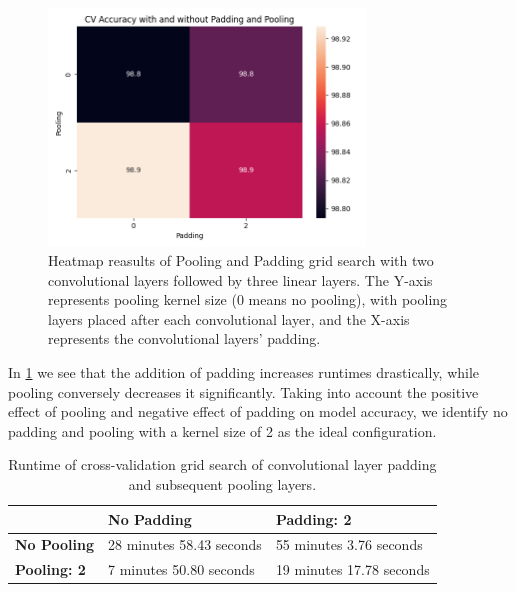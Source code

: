 \begin{figure}[H]
    \centering
    \includegraphics[width=0.75\textwidth]{results/cnn_grid_search/heatmap_grid_search_pp.png}
    \caption{Heatmap reasults of Pooling and Padding grid search with two convolutional layers followed by three linear layers. The Y-axis represents pooling kernel size (0 means no pooling), with pooling layers placed after each convolutional layer, and the X-axis represents the convolutional layers' padding.}
    \label{fig:cnn_pp}
\end{figure}

In \ref{table:runtimes_pp} we see that the addition of padding increases runtimes drastically, while pooling conversely decreases it significantly. Taking into account the positive effect of pooling and negative effect of padding on model accuracy, we identify no padding and pooling with a kernel size of 2 as the ideal configuration.

\begin{table}[H]
    \centering
    \caption{Runtime of cross-validation grid search of convolutional layer padding and subsequent pooling layers.}
    \label{table:runtimes_pp}
\begin{tabular}{|l|l|l|}
\hline
                    & \textbf{No Padding}      & \textbf{Padding: 2}      \\ \hline
\textbf{No Pooling} & 28 minutes 58.43 seconds & 55 minutes 3.76 seconds \\ \hline
\textbf{Pooling: 2} & 7 minutes 50.80 seconds & 19 minutes 17.78 seconds \\ \hline
\end{tabular}
\end{table}

\newpage
